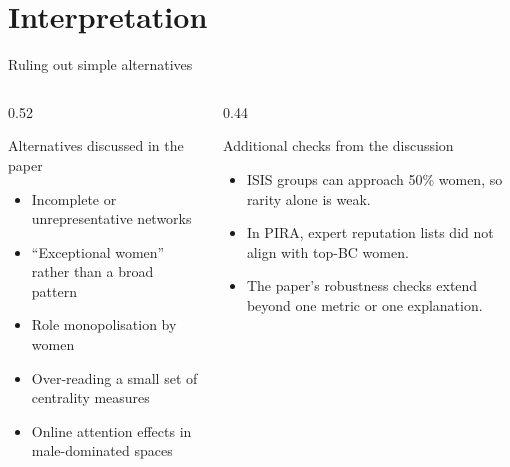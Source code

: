 \section{Interpretation}

\begin{frame}{Ruling out simple alternatives}
  \small
  \begin{columns}[T,onlytextwidth]
    \begin{column}{0.52\textwidth}
      \begin{block}{Alternatives discussed in the paper}
        \begin{itemize}
          \item Incomplete or unrepresentative networks
          \item “Exceptional women” rather than a broad pattern
          \item Role monopolisation by women
          \item Over-reading a small set of centrality measures
          \item Online attention effects in male-dominated spaces
        \end{itemize}
      \end{block}
    \end{column}

    \begin{column}{0.44\textwidth}
      \begin{exampleblock}{Additional checks from the discussion}
        \begin{itemize}
          \item ISIS groups can approach 50\% women, so rarity alone is weak.
          \item In PIRA, expert reputation lists did not align with top-BC women.
          \item The paper's robustness checks extend beyond one metric or one explanation.
        \end{itemize}
      \end{exampleblock}
    \end{column}
  \end{columns}

\end{frame}

